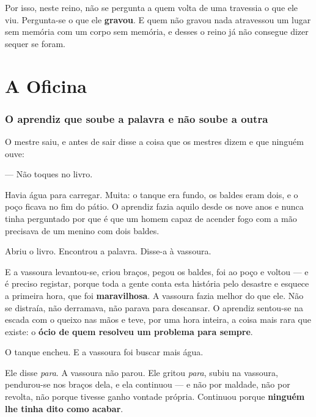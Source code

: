 \documentclass[livro.tex]{subfiles}
\begin{document}
Por isso, neste reino, não se pergunta a quem volta de uma travessia o que ele viu.
Pergunta-se o que ele \textbf{gravou}. E quem não gravou nada atravessou um lugar sem
memória com um corpo sem memória, e desses o reino já não consegue dizer sequer se foram.



\part{A Oficina}

\section{O aprendiz que soube a palavra e não soube a outra}

O mestre saiu, e antes de sair disse a coisa que os mestres dizem e que ninguém ouve:

--- Não toques no livro.

\medskip

Havia água para carregar. Muita: o tanque era fundo, os baldes eram dois, e o poço ficava
no fim do pátio. O aprendiz fazia aquilo desde os nove anos e nunca tinha perguntado por
que é que um homem capaz de acender fogo com a mão precisava de um menino com dois baldes.

Abriu o livro. Encontrou a palavra. Disse-a à vassoura.

E a vassoura levantou-se, criou braços, pegou os baldes, foi ao poço e voltou --- e é
preciso registar, porque toda a gente conta esta história pelo desastre e esquece a
primeira hora, que foi \textbf{maravilhosa}. A vassoura fazia melhor do que ele. Não se
distraía, não derramava, não parava para descansar. O aprendiz sentou-se na escada com o
queixo nas mãos e teve, por uma hora inteira, a coisa mais rara que existe: o
\textbf{ócio de quem resolveu um problema para sempre}.

\medskip

O tanque encheu. E a vassoura foi buscar mais água.

\medskip

Ele disse \emph{para}. A vassoura não parou. Ele gritou \emph{para}, subiu na vassoura,
pendurou-se nos braços dela, e ela continuou --- e não por maldade, não por revolta, não
porque tivesse ganho vontade própria. Continuou porque \textbf{ninguém lhe tinha dito
como acabar}.
\end{document}
